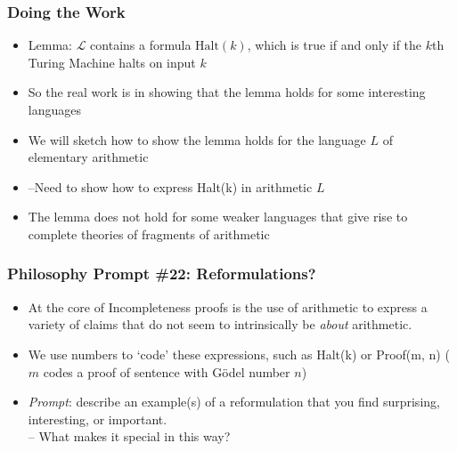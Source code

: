 \begin{frame}
\frametitle{Doing the Work}

\begin{itemize}[<+->]

\item Lemma: $\mathcal{L}$ contains a formula \(\mbox{Halt}(k)\), which is true if and only if the $k$th Turing Machine halts on input \(k\)

\item So the real work is in showing that the lemma holds for some interesting languages



\item We will sketch how to show the lemma holds for the language $L$ of elementary arithmetic

\item[] --Need to show how to express \textrm{Halt(k)}
 in arithmetic $L$

\item The lemma does not hold for some weaker languages that give rise to complete theories of fragments of arithmetic

\end{itemize}
\end{frame}

\begin{frame}
\frametitle{Philosophy Prompt \#22: Reformulations?}

\begin{itemize}[<+->]

\item At the core of Incompleteness proofs is the use of arithmetic to express a variety of claims that do not seem to intrinsically be \textit{about} arithmetic. 

\item We use numbers to `code' these expressions, such as \textrm{Halt(k)} or \textrm{Proof(m, n)} ($m$ codes a proof of sentence with G\"odel number $n$)

\item \emph{Prompt}: describe an example(s) of a reformulation that you find surprising, interesting, or important. \\ -- What makes it special in this way? 



\end{itemize}
\end{frame}

